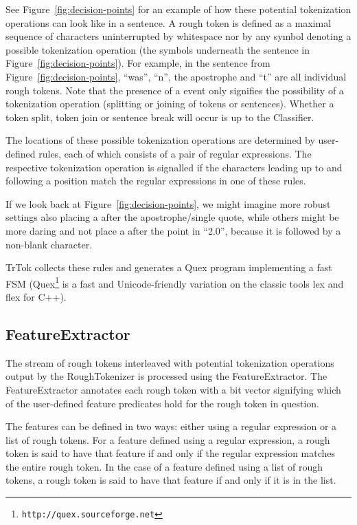 See Figure~\ref{fig:decision-points} for an example of how these
potential tokenization operations can look like in a sentence. A rough
token is defined as a maximal sequence of characters uninterrupted by
whitespace nor by any symbol denoting a possible tokenization
operation (the symbols underneath the sentence in
Figure~\ref{fig:decision-points}). For example, in the sentence from
Figure~\ref{fig:decision-points}, ``was'', ``n'', the apostrophe and
``t'' are all individual rough tokens. Note that the presence of a
\may{} event only signifies the possibility of a tokenization
operation (splitting or joining of tokens or sentences). Whether a
token split, token join or sentence break will occur is up to the
Classifier.

The locations of these possible tokenization operations are determined
by user-defined rules, each of which consists of a pair of regular
expressions. The respective tokenization operation is signalled if the
characters leading up to and following a position match the regular
expressions in one of these rules.

If we look back at Figure~\ref{fig:decision-points}, we might imagine
more robust settings also placing a \maybreaksentence{} after the
apostrophe/single quote, while others might be more daring and not
place a \maybreaksentence{} after the point in ``2.0'', because it is
followed by a non-blank character.

TrTok collects these rules and generates a Quex program implementing a
fast FSM (Quex\footnote{\texttt{http://quex.sourceforge.net}} is a
fast and Unicode-friendly variation on the classic tools lex and flex
for C++).

\subsection{FeatureExtractor}

The stream of rough tokens interleaved with potential tokenization
operations output by the RoughTokenizer is processed using the
FeatureExtractor. The FeatureExtractor annotates each rough token with
a bit vector signifying which of the user-defined feature predicates
hold for the rough token in question.

The features can be defined in two ways: either using a regular
expression or a list of rough tokens. For a feature defined using a
regular expression, a rough token is said to have that feature if and
only if the regular expression matches the entire rough token. In the
case of a feature defined using a list of rough tokens, a rough token
is said to have that feature if and only if it is in the list.

